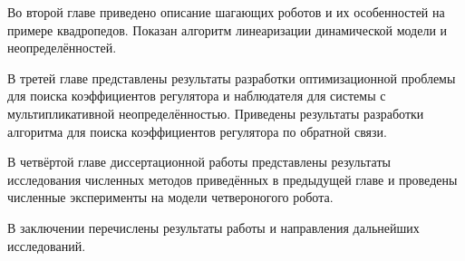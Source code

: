 Во второй главе приведено описание шагающих роботов и их особенностей на примере квадропедов. Показан алгоритм линеаризации динамической модели и неопределённостей.

В третей главе представлены результаты разработки оптимизационной проблемы для поиска коэффициентов регулятора и наблюдателя для системы с мультипликативной неопределённостью. Приведены результаты разработки алгоритма для поиска коэффициентов регулятора по обратной связи.

В четвёртой главе диссертационной работы представлены результаты исследования численных методов приведённых в предыдущей главе и проведены численные эксперименты на модели четвероногого робота.

В заключении перечислены результаты работы и направления дальнейших исследований.